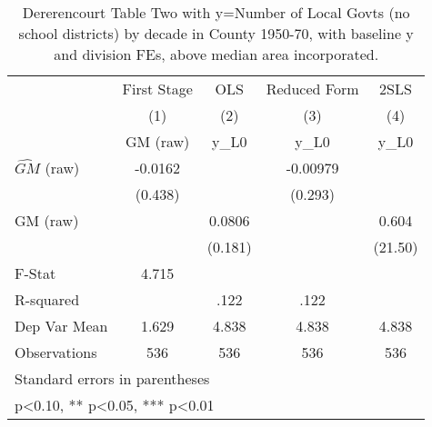 \begin{table}[htbp]\centering
\def\sym#1{\ifmmode^{#1}\else\(^{#1}\)\fi}
\caption{Dererencourt Table Two with y=Number of Local Govts (no school districts) by decade in County 1950-70, with baseline y and division FEs, above median area incorporated.}
\begin{tabular}{l*{4}{c}}
\toprule
                    & First Stage   &         OLS   &Reduced Form   &        2SLS   \\
                    &\multicolumn{1}{c}{(1)}&\multicolumn{1}{c}{(2)}&\multicolumn{1}{c}{(3)}&\multicolumn{1}{c}{(4)}\\
                    &\multicolumn{1}{c}{GM  (raw)}&\multicolumn{1}{c}{y\_L0}&\multicolumn{1}{c}{y\_L0}&\multicolumn{1}{c}{y\_L0}\\
\midrule
$\hat{GM}$ (raw)    &     -0.0162   &               &    -0.00979   &               \\
                    &     (0.438)   &               &     (0.293)   &               \\
\addlinespace
GM  (raw)           &               &      0.0806   &               &       0.604   \\
                    &               &     (0.181)   &               &     (21.50)   \\
\midrule
F-Stat              &       4.715   &               &               &               \\
R-squared           &               &        .122   &        .122   &               \\
Dep Var Mean        &       1.629   &       4.838   &       4.838   &       4.838   \\
Observations        &         536   &         536   &         536   &         536   \\
\bottomrule
\multicolumn{5}{l}{\footnotesize Standard errors in parentheses}\\
\multicolumn{5}{l}{\footnotesize * p<0.10, ** p<0.05, *** p<0.01}\\
\end{tabular}
\end{table}
